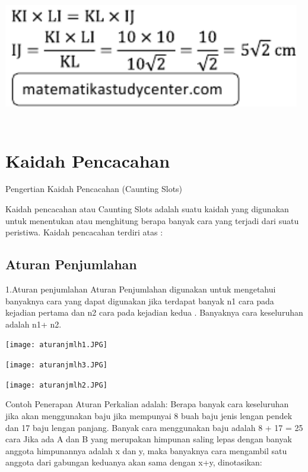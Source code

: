 \documentclass[11pt,fleqn]{book} %
\begin{document}
	\includegraphics[width = 13cm, height= 6cm]{Pictures/dede16.png}

\chapter{Kaidah Pencacahan}

Pengertian Kaidah Pencacahan (Caunting Slots)


Kaidah pencacahan atau Caunting Slots adalah suatu kaidah yang digunakan untuk menentukan atau menghitung berapa banyak cara yang terjadi dari suatu peristiwa. Kaidah pencacahan terdiri atas :

\section{Aturan Penjumlahan}
1.Aturan penjumlahan
Aturan Penjumlahan digunakan untuk mengetahui banyaknya cara yang dapat digunakan jika terdapat banyak n1 cara pada kejadian pertama dan n2 cara pada kejadian kedua . Banyaknya
cara keseluruhan adalah n1+ n2.

\begin{center}
\texttt{[image: aturanjmlh1.JPG]}
\end{center}

\begin{center}
\texttt{[image: aturanjmlh3.JPG]}
\end{center}

\begin{center}
\texttt{[image: aturanjmlh2.JPG]}
\end{center}
Contoh Penerapan Aturan Perkalian adalah:
Berapa banyak cara keseluruhan jika akan menggunakan baju jika mempunyai 8 buah baju jenis
lengan pendek dan 17 baju lengan panjang.
Banyak cara menggunakan baju adalah 8 + 17 = 25 cara
 Jika ada A dan B yang merupakan himpunan saling lepas dengan banyak anggota himpunannya adalah x dan y, maka banyaknya cara mengambil satu anggota dari gabungan keduanya akan sama dengan x+y, dinotasikan:
 
\end{document}
